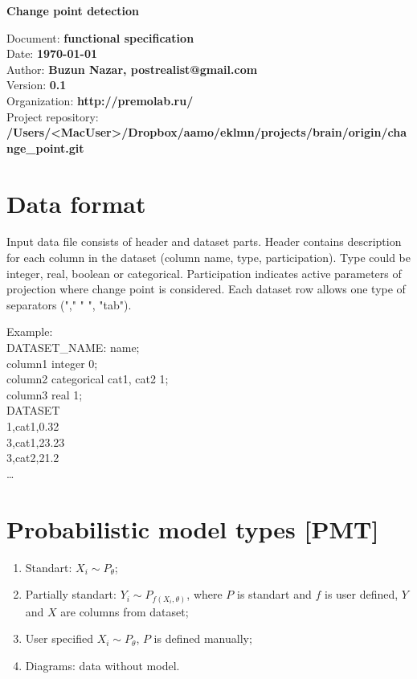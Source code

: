 \documentclass[a4paper,12pt]{report} %
\makeatletter
\theoremstyle{definition}
\newcommand{\thedate}{Date: \textbf{ \today}}
\newcommand{\thetitle}{{\LARGE\textbf{ Change point detection}}}
\newcommand{\doctype}{Document: \textbf{functional specification}}
\newcommand{\auth}{Author: \textbf{Buzun Nazar, postrealist@gmail.com}}
\newcommand{\version}{Version: \textbf{0.1}}
\newcommand{\org}{Organization: \textbf{http://premolab.ru/}}
\newcommand{\rep}{Project repository: \\ \textbf{/Users/<MacUser>/Dropbox/aamo/eklmn/projects/brain/origin/change\_point.git}}
\makeatother
\begin{document}
    


\begin{titlepage}


\begin{center}
   \thetitle\\$ $\\
\end{center}
  \doctype \\
   \thedate \\
   \auth \\
   \version \\   
   \org   \\
  \rep \\
   
\end{titlepage}
   
    \tableofcontents 
    
\section{Data format}

Input data file consists of header and dataset parts. Header contains description for each column in the dataset (column name, type, participation). Type could be integer, real, boolean or categorical. Participation indicates active parameters of projection where change point is considered. Each dataset row allows one type of separators ("," " ", "tab").

Example:\\

\noindent DATASET\_NAME: name;\\
column1 integer 0;\\
column2 categorical {cat1, cat2} 1;\\
column3 real 1;\\

\noindent DATASET\\
1,cat1,0.32\\
3,cat1,23.23\\
3,cat2,21.2\\
\ldots    \\

\section{Probabilistic model types [PMT]}

\begin{enumerate}
\item Standart: $X_i \sim P_{\theta}$;
\item Partially standart: $Y_i \sim P_{f(X_i, \theta)}$, where $P$ is standart and $f$ is user defined, $Y$ and $X$ are columns from dataset;
\item User specified $X_i \sim P_{\theta}$, $P$ is defined manually;
\item Diagrams: data without model.
\end{enumerate}
\end{document}

